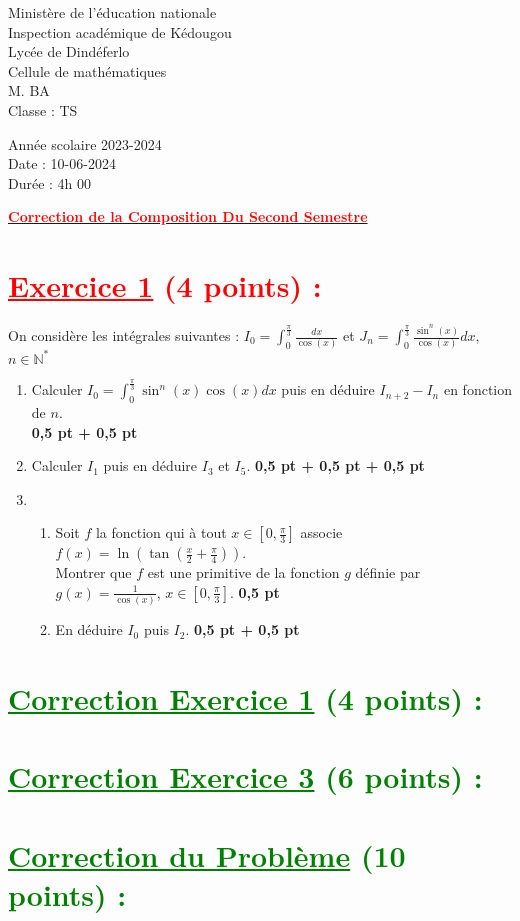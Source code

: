 \documentclass[12pt]{article}
\begin{document}
\begin{minipage}{0.5\textwidth}
	Ministère de l'éducation nationale  \\
	Inspection académique de Kédougou   \\
	Lycée de Dindéferlo            \\
	Cellule de mathématiques            \\
	M. BA                          \\
	Classe : TS  \\
\end{minipage}
\begin{minipage}{0.5\textwidth}
	Année scolaire 2023-2024 \\
	Date : 10-06-2024 \\
	Durée : 4h 00 \\
\end{minipage}

\begin{center}
	\textbf{{\underline{\textcolor{red}{Correction de la Composition Du Second Semestre}}}}
\end{center}
\section*{\textcolor{red}{\underline{Exercice 1} (4 points) :}}
On considère les intégrales suivantes : $I_{0}=\int_{0}^{\frac{\pi}{3}} \frac{dx}{\cos (x)}$ et $J_{n}=\int_{0}^{\frac{\pi}{3}} \frac{\sin^{n}(x)}{\cos(x)}dx,$ $n \in \mathbb{N}^{*}$

\begin{enumerate}
    \item Calculer $I_{0}=\int_{0}^{\frac{\pi}{3}} \sin^{n}(x)\cos(x)dx$ puis en déduire $I_{n+2}-I_{n}$ en fonction de $n$.\\ \textbf{0,5 pt + 0,5 pt}
    \item Calculer $I_{1}$ puis en déduire $I_{3}$ et $I_{5}$. \textbf{0,5 pt + 0,5 pt + 0,5 pt}
    \item 
    \begin{enumerate}
        \item Soit $f$ la fonction qui à tout $x \in \left[0, \frac{\pi}{3}\right]$ associe $f(x) = \ln\left( \tan\left(\frac{x}{2}+\frac{\pi}{4}\right)\right)$.\\ Montrer que $f$ est une primitive de la fonction $g$ définie par $g(x) = \frac{1}{\cos(x)}$, $x \in \left[0, \frac{\pi}{3}\right]$. \textbf{0,5 pt}
        \item En déduire $I_{0}$ puis $I_{2}$. \textbf{0,5 pt + 0,5 pt}
    \end{enumerate}
\end{enumerate}


\section*{\textcolor{green}{\underline{Correction Exercice 1} (4 points) :}}

\section*{\textcolor{green}{\underline{Correction Exercice 3} (6 points) :}}

\section*{\textcolor{green}{\underline{Correction du Problème} (10 points) :}}
\end{document}
